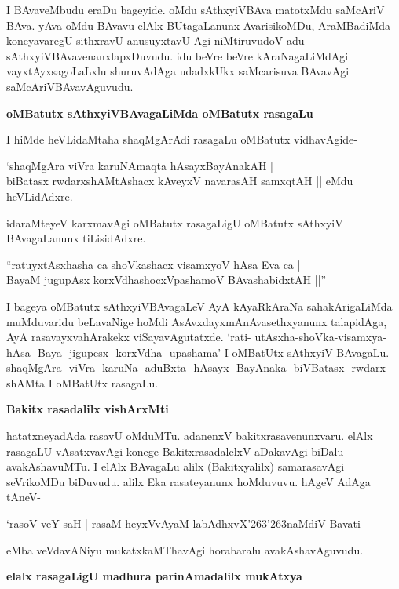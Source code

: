 I BAvaveMbudu eraDu bageyide. oMdu sAthxyiVBAva matotxMdu saMcAriV BAva. yAva oMdu BAvavu elAlx BUtagaLanunx AvarisikoMDu, AraMBadiMda koneyavaregU sithxravU anusuyxtavU Agi niMtiruvudoV adu sAthxyiVBAvavenanxlapxDuvudu. idu beVre beVre kAraNagaLiMdAgi vayxtAyxsagoLaLxlu shuruvAdAga udadxkUkx saMcarisuva BAvavAgi saMcAriVBAvavAguvudu.

\noindent
{\bf\large{oMBatutx sAthxyiVBAvagaLiMda oMBatutx rasagaLu}}\label{page230}

I hiMde heVLidaMtaha shaqMgArAdi rasagaLu oMBatutx vidhavAgide-

\begin{shloka}
`shaqMgAra viVra karuNAmaqta hAsayxBayAnakAH |\\\label{230}
biBatasx rwdarxshAMtAshacx kAveyxV navarasAH samxqtAH || eMdu heVLidAdxre.
\end{shloka}

idaraMteyeV karxmavAgi oMBatutx rasagaLigU oMBatutx sAthxyiV BAvagaLanunx tiLisidAdxre.

\begin{shloka}
``ratuyxtAsxhasha ca shoVkashacx visamxyoV hAsa Eva ca |\\\label{230}
BayaM jugupAsx korxVdhashocxVpashamoV BAvashabidxtAH ||''
\end{shloka}

I bageya oMBatutx sAthxyiVBAvagaLeV AyA kAyaRkAraNa sahakArigaLiMda muMduvaridu beLavaNige hoMdi AsAvxdayxmAnAvasethxyanunx talapidAga, AyA rasavayxvahArakekx viSayavAgutatxde. `rati- utAsxha-shoVka-visamxya- hAsa- Baya- jigupesx- korxVdha- upashama' I oMBatUtx sAthxyiV BAvagaLu. shaqMgAra- viVra- karuNa- aduBxta- hAsayx- BayAnaka- biVBatasx- rwdarx- shAMta I oMBatUtx rasagaLu.

\noindent
{\bf\large{Bakitx rasadalilx vishArxMti}}\label{page231}

hatatxneyadAda rasavU oMduMTu. adanenxV bakitxrasavenunxvaru. elAlx rasagaLU vAsatxvavAgi konege BakitxrasadalelxV aDakavAgi biDalu avakAshavuMTu. I elAlx BAvagaLu alilx (Bakitxyalilx) samarasavAgi seVrikoMDu biDuvudu. alilx Eka rasateyanunx hoMduvuvu. hAgeV AdAga tAneV-

\begin{shloka}
`rasoV veY saH | rasaM heyxVvAyaM labAdhxvX\char'263\char'263naMdiV Bavati\label{231}
\end{shloka}

eMba veVdavANiyu mukatxkaMThavAgi horabaralu avakAshavAguvudu.

\noindent
{\bf\large{elalx rasagaLigU madhura parinAmadalilx mukAtxya}}\label{page231}

